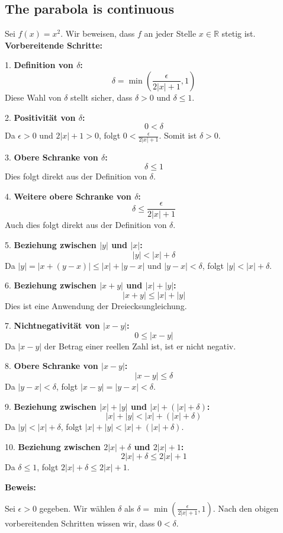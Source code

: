 \subsection{The parabola is continuous}

Sei $f(x) = x^2$. Wir beweisen, dass $f$ an jeder Stelle $x \in \mathbb{R}$ stetig ist. 
\textbf{Vorbereitende Schritte:}

1. \textbf{Definition von $\delta$:}
   \[
   \delta = \min\left(\frac{\epsilon}{2|x| + 1}, 1\right)
   \]
   Diese Wahl von $\delta$ stellt sicher, dass $\delta > 0$ und $\delta \leq 1$.

2. \textbf{Positivität von $\delta$:}
   \[
   0 < \delta
   \]
   Da $\epsilon > 0$ und $2|x| + 1 > 0$, folgt $0 < \frac{\epsilon}{2|x| + 1}$. Somit ist $\delta > 0$.

3. \textbf{Obere Schranke von $\delta$:}
   \[
   \delta \leq 1
   \]
   Dies folgt direkt aus der Definition von $\delta$.

4. \textbf{Weitere obere Schranke von $\delta$:}
   \[
   \delta \leq \frac{\epsilon}{2|x| + 1}
   \]
   Auch dies folgt direkt aus der Definition von $\delta$.

5. \textbf{Beziehung zwischen $|y|$ und $|x|$:}
   \[
   |y| < |x| + \delta
   \]
   Da $|y| = |x + (y - x)| \leq |x| + |y - x|$ und $|y - x| < \delta$, folgt $|y| < |x| + \delta$.

6. \textbf{Beziehung zwischen $|x + y|$ und $|x| + |y|$:}
   \[
   |x + y| \leq |x| + |y|
   \]
   Dies ist eine Anwendung der Dreiecksungleichung.

7. \textbf{Nichtnegativität von $|x - y|$:}
   \[
   0 \leq |x - y|
   \]
   Da $|x - y|$ der Betrag einer reellen Zahl ist, ist er nicht negativ.

8. \textbf{Obere Schranke von $|x - y|$:}
   \[
   |x - y| \leq \delta
   \]
   Da $|y - x| < \delta$, folgt $|x - y| = |y - x| < \delta$.

9. \textbf{Beziehung zwischen $|x| + |y|$ und $|x| + (|x| + \delta)$:}
   \[
   |x| + |y| < |x| + (|x| + \delta)
   \]
   Da $|y| < |x| + \delta$, folgt $|x| + |y| < |x| + (|x| + \delta)$.

10. \textbf{Beziehung zwischen $2|x| + \delta$ und $2|x| + 1$:}
    \[
    2|x| + \delta \leq 2|x| + 1
    \]
    Da $\delta \leq 1$, folgt $2|x| + \delta \leq 2|x| + 1$.

\textbf{Beweis:}

Sei $\epsilon > 0$ gegeben. Wir wählen $\delta$ als $\delta = \min\left(\frac{\epsilon}{2|x| + 1}, 1\right)$. Nach den obigen vorbereitenden Schritten wissen wir, dass $0 < \delta$.

